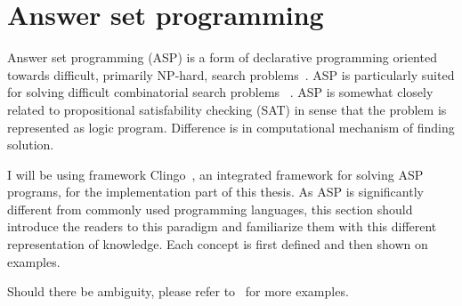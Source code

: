 \chapter{Answer set programming}

Answer set programming (ASP) is a form of declarative
programming oriented towards difficult, primarily NP-hard,
search problems~\cite{lifschitz2008answer}.
ASP is particularly suited for solving difficult combinatorial search problems%
~\cite{anger2005glimpse}.
ASP is somewhat closely related to propositional
satisfability checking (SAT)
in sense that the problem is represented as logic program. Difference is in
computational mechanism of finding solution.

I will be using framework Clingo~\cite{gebser2019potassco},
an integrated framework for solving ASP programs, for the implementation
part of this thesis. As ASP is significantly different from commonly used
programming languages, this section should introduce the readers to this paradigm
and familiarize them with this different representation of knowledge.
Each concept is first defined and then shown on examples.

Should there be ambiguity, please refer to~\cite{KRHandbook} for more examples.
